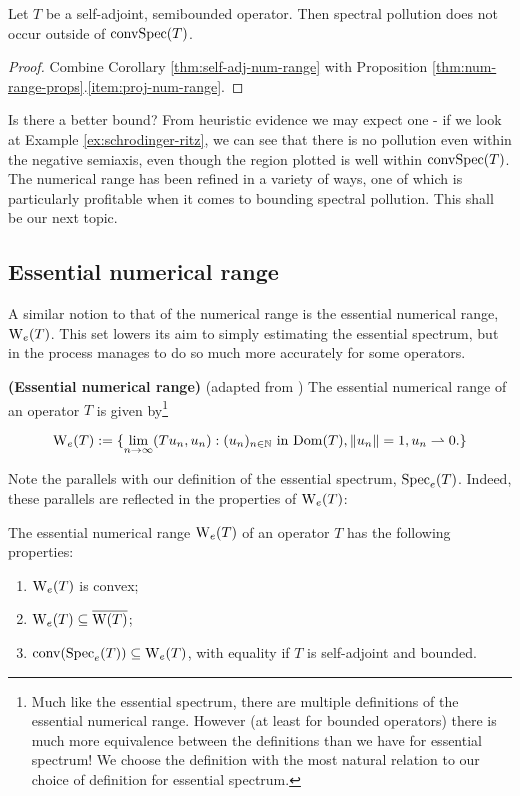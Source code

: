 \documentclass[../main.tex]{subfiles}
\begin{document}
\begin{corollary}
Let $T$ be a self-adjoint, semibounded operator. Then spectral pollution does not occur outside of $\mathrm{conv}\mathrm{Spec}(T)$.
\end{corollary}
\begin{proof}
Combine Corollary \ref{thm:self-adj-num-range} with Proposition \ref{thm:num-range-props}.\ref{item:proj-num-range}.
\end{proof}

Is there a better bound? From heuristic evidence we may expect one - if we look at Example \ref{ex:schrodinger-ritz}, we can see that there is no pollution
even within the negative semiaxis, even though the region plotted is well within $\mathrm{conv}\mathrm{Spec}(T)$. The numerical range has been refined in a variety
of ways, one of which is particularly profitable when it comes to bounding spectral pollution. This shall be our next topic.

\subsection{Essential numerical range}
A similar notion to that of the numerical range is the essential numerical range, $\mathrm{W}_e (T)$. This set lowers its aim to simply estimating the essential spectrum,
but in the process manages to do so much more accurately for some operators.

\begin{definition}{\textbf{(Essential numerical range)}} (adapted from \cite{fillmore1972essential})
The essential numerical range of an operator $T$ is given by\footnote{Much like the essential spectrum, there are multiple definitions of the essential numerical range.
However (at least for bounded operators) there is much more equivalence between the definitions than we have for essential spectrum! \cite{fillmore1972essential} We choose the definition with the most
natural relation to our choice of definition for essential spectrum.}

$$\mathrm{W}_e (T) := \{\lim_{n \rightarrow \infty}( Tu_n, u_n ) : (u_n)_{n \in \mathbb{N}}\text{ in } \mathrm{Dom}(T), \|u_n\|=1, u_n \rightharpoonup 0.\}$$
\end{definition}
Note the parallels with our definition of the essential spectrum, $\mathrm{Spec}_e(T)$. Indeed, these parallels are reflected in the properties of $\mathrm{W}_e(T)$:

\begin{proposition}\label{thm:nume-props} The essential numerical range $\mathrm{W}_e(T)$ of an operator $T$ has the following properties:
\begin{enumerate}
\item\label{item:nume-convex} $\mathrm{W}_e(T)$ is convex;
\item\label{item:nume-in-clos-num} $\mathrm{W}_e(T) \subseteq \overline{\mathrm{W}(T)}$;
\item\label{item:nume-is-hull} $\mathrm{conv}(\mathrm{Spec}_e(T)) \subseteq \mathrm{W}_e(T)$, with equality if $T$ is self-adjoint and bounded.
\end{enumerate}
\end{proposition}
\end{document}
